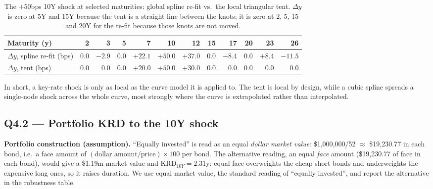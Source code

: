 \documentclass[11pt]{article}
\newcommand{\question}[1]{\subsection*{\textcolor{edhecred}{#1}}}
\begin{document}
\begin{table}[h]
\centering
\footnotesize
\begin{tabular}{l *{11}{r}}
\toprule
Maturity (y) & 2 & 3 & 5 & 7 & 10 & 12 & 15 & 17 & 20 & 23 & 26 \\
\midrule
$\Delta y$, spline re-fit (bps) & 0.0 & $-2.9$ & 0.0 & $+22.1$ & $+50.0$ & $+37.0$ & 0.0 & $-8.4$ & 0.0 & $+8.4$ & $-11.5$ \\
$\Delta y$, tent (bps)          & 0.0 & 0.0 & 0.0 & $+20.0$ & $+50.0$ & $+30.0$ & 0.0 & 0.0 & 0.0 & 0.0 & 0.0 \\
\bottomrule
\end{tabular}
\caption{The $+50$bps 10Y shock at selected maturities: global spline re-fit
vs.\ the local triangular tent. $\Delta y$ is zero at 5Y and 15Y because the
tent is a straight line between the knots; it is zero at 2, 5, 15 and 20Y for
the re-fit because those knots are not moved.}
\end{table}

In short, a key-rate shock is only as local as the curve model it is applied
to. The tent is local by design, while a cubic spline spreads a single-node
shock across the whole curve, most strongly where the curve is extrapolated
rather than interpolated.

\question{Q4.2 --- Portfolio KRD to the 10Y shock}

\textbf{Portfolio construction (assumption).} ``Equally invested'' is read as
an equal \emph{dollar market value}: \$1,000,000/52 $\approx$ \$19{,}230.77
in each bond, i.e.\ a face amount of
$(\text{dollar amount}/\text{price})\times 100$ per bond. The alternative
reading, an equal \emph{face} amount (\$19{,}230.77 of face in each bond),
would give a \$1.19m market value and $\text{KRD}_{10Y}=2.31$y: equal face
overweights the cheap short bonds and underweights the expensive long ones,
so it raises duration. We use equal market value, the standard reading of
``equally invested'', and report the alternative in the robustness table.
\end{document}
